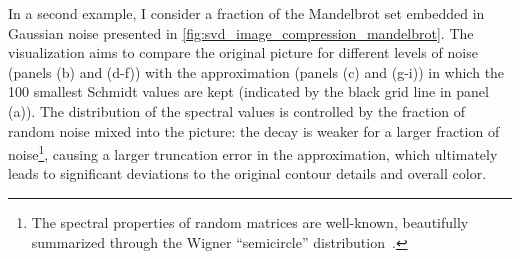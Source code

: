 In a second example, I consider a fraction of the Mandelbrot set embedded in Gaussian noise presented in \cref{fig:svd_image_compression_mandelbrot}.
The visualization aims to compare the original picture for different levels of noise (panels (b) and (d-f)) with the approximation (panels (c) and (g-i)) in which the 100 smallest Schmidt values are kept (indicated by the black grid line in panel (a)).
The distribution of the spectral values is controlled by the fraction of random noise mixed into the picture: the decay is weaker for a larger fraction of noise\footnote{The spectral properties of random matrices are well-known, beautifully summarized through the Wigner ``semicircle'' distribution~\cite{Wigner1958OnTD}.}, causing a larger truncation error in the approximation, which ultimately leads to significant deviations to the original contour details and overall color.

